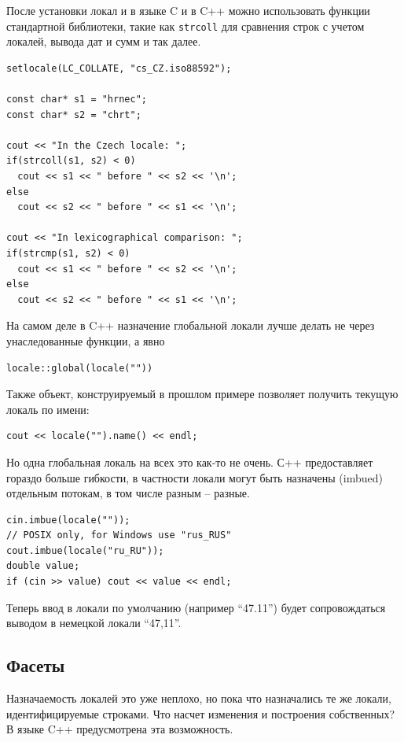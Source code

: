 \documentclass[a4paper,12pt,oneside]{book}
\begin{document}
После установки локал
и в языке C и в C++ можно использовать функции стандартной библиотеки, такие как \lstinline!strcoll! для сравнения строк с учетом локалей, вывода дат и сумм и так далее.

\begin{lstlisting}
setlocale(LC_COLLATE, "cs_CZ.iso88592");
 
const char* s1 = "hrnec";
const char* s2 = "chrt";
 
cout << "In the Czech locale: ";
if(strcoll(s1, s2) < 0)
  cout << s1 << " before " << s2 << '\n';
else
  cout << s2 << " before " << s1 << '\n';

cout << "In lexicographical comparison: ";
if(strcmp(s1, s2) < 0)
  cout << s1 << " before " << s2 << '\n';
else
  cout << s2 << " before " << s1 << '\n';
\end{lstlisting}

На самом деле в C++ назначение глобальной локали лучше делать не через унаследованные функции, а явно

\begin{lstlisting}
locale::global(locale(""))
\end{lstlisting}

Также объект, конструируемый в прошлом примере позволяет получить текущую локаль по имени:

\begin{lstlisting}
cout << locale("").name() << endl;
\end{lstlisting}

Но одна глобальная локаль на всех это как-то не очень. С++ предоставляет гораздо больше гибкости, в частности локали могут быть назначены (imbued) отдельным потокам, в том числе разным -- разные.

\begin{lstlisting}
cin.imbue(locale(""));
// POSIX only, for Windows use "rus_RUS"
cout.imbue(locale("ru_RU")); 
double value;
if (cin >> value) cout << value << endl;
\end{lstlisting}

Теперь ввод в локали по умолчанию (например ``47.11'') будет сопровождаться выводом в немецкой локали ``47,11''.

\subsection{Фасеты}\label{subsubsec:facets}

Назначаемость локалей это уже неплохо, но пока что назначались те же локали, идентифицируемые строками. Что насчет изменения и построения собственных? В языке C++ предусмотрена эта возможность.
\end{document}

